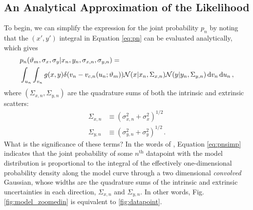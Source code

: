 \subsection{An Analytical Approximation of the Likelihood}
\label{sec:tgtpts}
To begin, we can simplify the expression for the joint probability $p_n$ by noting that the $(x',y')$ integral in Equation \eqref{eq:pn} can be evaluated analytically, which gives
\begin{align}\label{eq:pnsimp}
& p_n(\vartheta_m,\sigma_x,\sigma_y|x_n,y_n,\sigma_{x,n},\sigma_{y,n}) = \nonumber\\
& \int_{u_n}\int_{v_n}{g(x,y)\delta(v_n-v_{c,n}(u_n;\vartheta_m))}\mathcal{N}(x|x_n,\Sigma_{x,n})\mathcal{N}(y|y_n,\Sigma_{y,n})\mathop{}\!\mathrm{d} v_n \mathop{}\!\mathrm{d} u_n \,,
\end{align}
where $(\Sigma_{x,n}, \Sigma_{y,n})$ are the quadrature sums of both the intrinsic and extrinsic scatters:
\begin{align}\label{eq:bigsigs}
\Sigma_{x,n} & \equiv \left( \sigma_{x,n}^2 + \sigma_x^2 \right)^{1/2} \nonumber\\
\Sigma_{y,n} & \equiv \left( \sigma_{y,n}^2 + \sigma_y^2 \right)^{1/2} \, . 
\end{align}
What is the significance of these terms? In the words of \textcite{trotter}, Equation \eqref{eq:pnsimp} indicates that the joint probability of some $n^\text{th}$ datapoint with the model distribution is proportional to the integral of the effectively one-dimensional probability density along the model curve through a two dimensional \textit{convolved} Gaussian, whose widths are the quadrature sums of the intrinsic and extrinsic uncertainties in each direction, $\Sigma_{x,n}$ and $\Sigma_{y,n}$. In other words, Fig. \ref{fig:model_zoomedin} is equivalent to \ref{fig:datapoint}.

